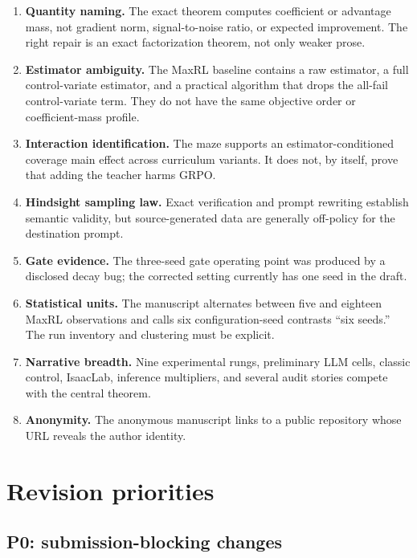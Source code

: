 \documentclass[11pt]{article}
\theoremstyle{definition}
\theoremstyle{remark}
\begin{document}
\begin{enumerate}[leftmargin=2em]
\item \textbf{Quantity naming.} The exact theorem computes coefficient or advantage mass, not gradient norm, signal-to-noise ratio, or expected improvement. The right repair is an exact factorization theorem, not only weaker prose.
\item \textbf{Estimator ambiguity.} The MaxRL baseline contains a raw estimator, a full control-variate estimator, and a practical algorithm that drops the all-fail control-variate term. They do not have the same objective order or coefficient-mass profile.
\item \textbf{Interaction identification.} The maze supports an estimator-conditioned coverage main effect across curriculum variants. It does not, by itself, prove that adding the teacher harms GRPO.
\item \textbf{Hindsight sampling law.} Exact verification and prompt rewriting establish semantic validity, but source-generated data are generally off-policy for the destination prompt.
\item \textbf{Gate evidence.} The three-seed gate operating point was produced by a disclosed decay bug; the corrected setting currently has one seed in the draft.
\item \textbf{Statistical units.} The manuscript alternates between five and eighteen MaxRL observations and calls six configuration-seed contrasts ``six seeds.'' The run inventory and clustering must be explicit.
\item \textbf{Narrative breadth.} Nine experimental rungs, preliminary LLM cells, classic control, IsaacLab, inference multipliers, and several audit stories compete with the central theorem.
\item \textbf{Anonymity.} The anonymous manuscript links to a public repository whose URL reveals the author identity.
\end{enumerate}

\section{Revision priorities}

\subsection{P0: submission-blocking changes}
\end{document}
